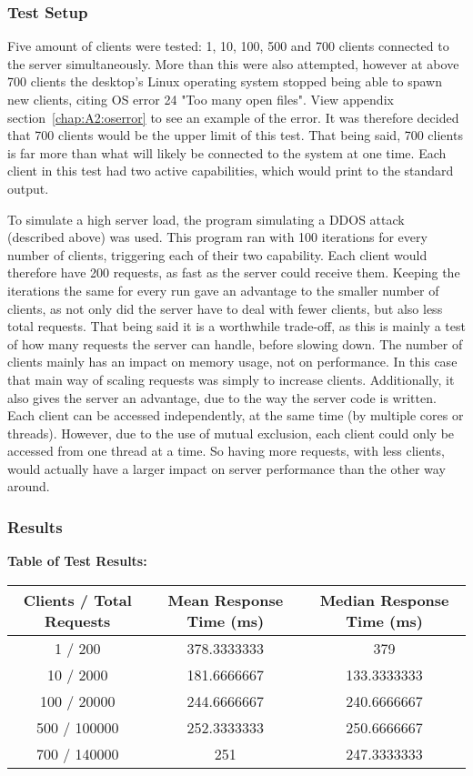 \subsubsection{Test Setup}
Five amount of clients were tested: 1, 10, 100, 500 and 700 clients connected to the server simultaneously. More than this were also attempted, however at above 700 clients the desktop's Linux operating system stopped being able to spawn new clients, citing OS error 24 "Too many open files". View appendix section~\ref{chap:A2:oserror} to see an example of the error. It was therefore decided that 700 clients would be the upper limit of this test. That being said, 700 clients is far more than what will likely be connected to the system at one time. Each client in this test had two active capabilities, which would print to the standard output.

To simulate a high server load, the program simulating a DDOS attack (described above) was used. This program ran with 100 iterations for every number of clients, triggering each of their two capability. Each client would therefore have 200 requests, as fast as the server could receive them. Keeping the iterations the same for every run gave an advantage to the smaller number of clients, as not only did the server have to deal with fewer clients, but also less total requests. That being said it is a worthwhile trade-off, as this is mainly a test of how many requests the server can handle, before slowing down. The number of clients mainly has an impact on memory usage, not on performance. In this case that main way of scaling requests was simply to increase clients. Additionally, it also gives the server an advantage, due to the way the server code is written. Each client can be accessed independently, at the same time (by multiple cores or threads). However, due to the use of mutual exclusion, each client could only be accessed from one thread at a time. So having more requests, with less clients, would actually have a larger impact on server performance than the other way around.

\subsubsection{Results}
\begin{center}
    \textbf{Table of Test Results:} 
\begin{tabular}{ |c|c|c| } 
 \hline
 Clients / Total Requests & Mean Response Time (ms) & Median Response Time (ms)\\ 
 \hline
 1 / 200 & 378.3333333 & 379 \\ 
 \hline
 10 / 2000 & 181.6666667 & 133.3333333 \\ 
 \hline
 100 / 20000 & 244.6666667 & 240.6666667 \\ 
 \hline
 500 / 100000 & 252.3333333 & 250.6666667 \\ 
 \hline
 700 / 140000 & 251 & 247.3333333 \\ 
 \hline
\end{tabular}
\end{center}

